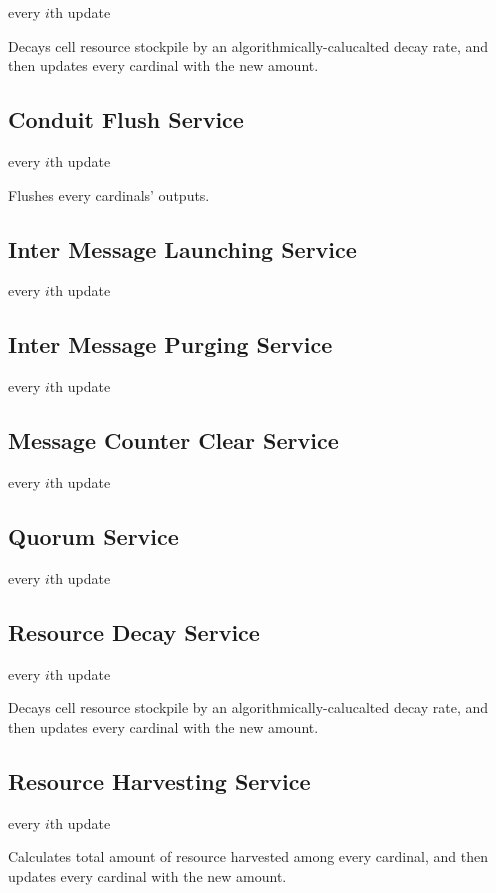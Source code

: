 every $i$th update

Decays cell resource stockpile by an algorithmically-calucalted decay rate, and then updates every cardinal with the new amount.

\subsection{Conduit Flush Service}

every $i$th update

Flushes every cardinals' outputs.

\subsection{Inter Message Launching Service}

every $i$th update


\subsection{Inter Message Purging Service}

every $i$th update

\subsection{Message Counter Clear Service}

every $i$th update

\subsection{Quorum Service}

every $i$th update

\subsection{Resource Decay Service}

every $i$th update

Decays cell resource stockpile by an algorithmically-calucalted decay rate, and then updates every cardinal with the new amount.

\subsection{Resource Harvesting Service}

every $i$th update

Calculates total amount of resource harvested among every cardinal, and then updates every cardinal with the new amount.

